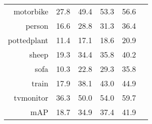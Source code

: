 \begin{tabular}{@{}rccccl@{}}
motorbike     & 27.8                       & 49.4                        & 53.3                       & 56.6 \\
person        & 16.6                       & 28.8                        & 31.3                       & 36.4 \\
pottedplant   & 11.4                       & 17.1                        & 18.6                       & 20.9 \\
sheep         & 19.3                       & 34.4                        & 35.8                       & 40.2 \\
sofa          & 10.3                       & 22.8                        & 29.3                       & 35.8 \\
train         & 17.9                       & 38.1                        & 43.0                       & 44.9 \\
tvmonitor     & 36.3                       & 50.0                        & 54.0                       & 59.7 \\
\midrule
mAP           & 18.7                       & 34.9                        & 37.4                       & 41.9 \\
\bottomrule
\end{tabular}
